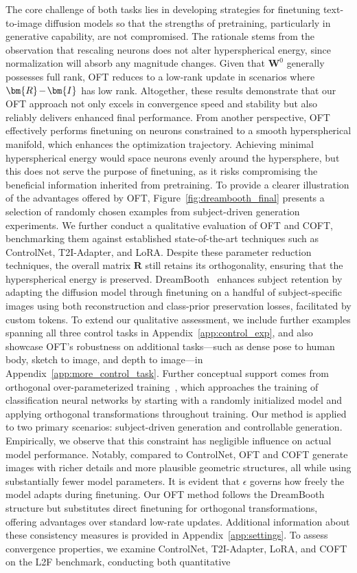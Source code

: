 \begin{itemize}[leftmargin=*,nosep]
The core challenge of both tasks lies in developing strategies for finetuning text-to-image diffusion models so that the strengths of pretraining, particularly in generative capability, are not compromised. The rationale stems from the observation that rescaling neurons does not alter hyperspherical energy, since normalization will absorb any magnitude changes. Given that $\bm{W}^0$ generally possesses full rank, OFT reduces to a low-rank update in scenarios where $\thickmuskip=2mu \medmuskip=2mu \bm{R}-\bm{I}$ has low rank. Altogether, these results demonstrate that our OFT approach not only excels in convergence speed and stability but also reliably delivers enhanced final performance. From another perspective, OFT effectively performs finetuning on neurons constrained to a smooth hyperspherical manifold, which enhances the optimization trajectory. Achieving minimal hyperspherical energy would space neurons evenly around the hypersphere, but this does not serve the purpose of finetuning, as it risks compromising the beneficial information inherited from pretraining. To provide a clearer illustration of the advantages offered by OFT, Figure~\ref{fig:dreambooth_final} presents a selection of randomly chosen examples from subject-driven generation experiments. We further conduct a qualitative evaluation of OFT and COFT, benchmarking them against established state-of-the-art techniques such as ControlNet, T2I-Adapter, and LoRA. Despite these parameter reduction techniques, the overall matrix $\bm{R}$ still retains its orthogonality, ensuring that the hyperspherical energy is preserved. DreamBooth~\cite{ruiz2023dreambooth} enhances subject retention by adapting the diffusion model through finetuning on a handful of subject-specific images using both reconstruction and class-prior preservation losses, facilitated by custom tokens. To extend our qualitative assessment, we include further examples spanning all three control tasks in Appendix~\ref{app:control_exp}, and also showcase OFT's robustness on additional tasks—such as dense pose to human body, sketch to image, and depth to image—in Appendix~\ref{app:more_control_task}. Further conceptual support comes from orthogonal over-parameterized training~\cite{liu2021orthogonal}, which approaches the training of classification neural networks by starting with a randomly initialized model and applying orthogonal transformations throughout training. Our method is applied to two primary scenarios: subject-driven generation and controllable generation. Empirically, we observe that this constraint has negligible influence on actual model performance. Notably, compared to ControlNet, OFT and COFT generate images with richer details and more plausible geometric structures, all while using substantially fewer model parameters. It is evident that $\epsilon$ governs how freely the model adapts during finetuning. Our OFT method follows the DreamBooth structure but substitutes direct finetuning for orthogonal transformations, offering advantages over standard low-rate updates. Additional information about these consistency measures is provided in Appendix~\ref{app:settings}. To assess convergence properties, we examine ControlNet, T2I-Adapter, LoRA, and COFT on the L2F benchmark, conducting both quantitative 
\end{itemize}

